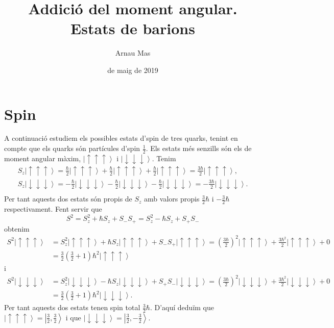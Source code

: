 \documentclass[12pt]{article}
\title{\sffamily {\bfseries Entrega 2:} Addició del moment angular. Estats de barions}
\author{\sffamily Arnau Mas}
\date{\sffamily 10 de maig de 2019}
\numberwithin{table}{section}
\numberwithin{figure}{section}
\numberwithin{equation}{section}
\renewcommand{\up}{\uparrow}
\newcommand{\down}{\downarrow}
\newcommand{\ket}[1]{\left\vert {#1} \right\rangle}
\begin{document}
\maketitle

\section{Spin}
A continuació estudiem els possibles estats d'spin de tres quarks, tenint en compte que els quarks són partícules d'spin \( \tfrac{1}{2} \). Els estats més senzills són els de moment angular màxim, \( \ket{\up\up\up} \) i \( \ket{\down\down\down} \). Tenim
\begin{gather*}
	S_z \ket{\up\up\up} = \frac{\hbar}{2}\ket{\up\up\up} + \frac{\hbar}{2}\ket{\up\up\up} + \frac{\hbar}{2}\ket{\up\up\up} = \frac{3\hbar}{2}\ket{\up\up\up}, \\
	S_z \ket{\down\down\down} = - \frac{\hbar}{2}\ket{\down\down\down} - \frac{\hbar}{2}\ket{\down\down\down} - \frac{\hbar}{2}\ket{\down\down\down} = -\frac{3\hbar}{2}\ket{\down\down\down}. \\
\end{gather*}
Per tant aquests dos estats són propis de \( S_z \) amb valors propis \( \frac{3}{2}\hbar \) i \( -\frac{3}{2}\hbar \) respectivament. Fent servir que
\begin{equation} \label{eq:S2}
	S^2 = S_z^2 + \hbar S_z + S_-S_+ = S_z^2 - \hbar S_z + S_+S_-
\end{equation}
obtenim
\begin{align*}
	S^2 \ket{\up\up\up} & = S_z^2\ket{\up\up\up} + \hbar S_z\ket{\up\up\up} + S_-S_+\ket{\up\up\up} = \left(\frac{3\hbar}{2}\right)^2\ket{\up\up\up} + \frac{3\hbar^2}{2}\ket{\up\up\up} + 0 \\ 
											& = \tfrac{3}{2}\left(\tfrac{3}{2} + 1\right)\hbar^2\ket{\up\up\up}
\end{align*}
i
\begin{align*}
	S^2 \ket{\down\down\down} & = S_z^2\ket{\down\down\down} - \hbar S_z\ket{\down\down\down} + S_+S_-\ket{\down\down\down} = \left(\frac{3\hbar}{2}\right)^2\ket{\down\down\down} + \frac{3\hbar^2}{2}\ket{\down\down\down} + 0 \\ 
											& = \tfrac{3}{2}\left(\tfrac{3}{2} + 1\right)\hbar^2\ket{\down\down\down}.
\end{align*}
Per tant aquests dos estats tenen spin total \( \frac{3}{2}\hbar \). D'aquí deduïm que \( \ket{\up\up\up} = \ket{\tfrac{3}{2}, \tfrac{3}{2}} \) i que \( \ket{\down\down\down} = \ket{\tfrac{3}{2}, -\tfrac{3}{2}} \). 
\end{document}
